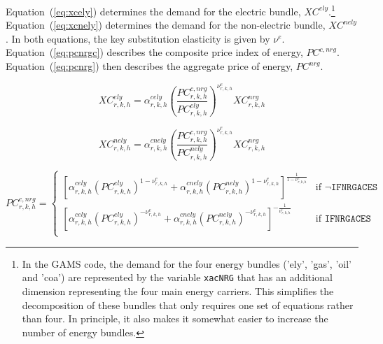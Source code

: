 \documentclass[11pt,letterpaper]{report}
\begin{document}
Equation~(\ref{eq:xcely}) determines the demand for the electric bundle,
$\mathit{XC}^{\mathit{ely}}$.\footnote{In the GAMS code, the demand for the four
energy bundles ('ely', 'gas', 'oil' and 'coa') are represented by the variable
\texttt{xacNRG} that has an additional dimension representing the four main
energy carriers. This simplifies the decomposition of these bundles that only
requires one set of equations rather than four. In principle, it also makes it
somewhat easier to increase the number of energy bundles.}
Equation~(\ref{eq:xcnely}) determines the demand for the non-electric bundle,
$\mathit{XC}^{\mathit{nely}}$. In both equations, the key substitution
elasticity is given by $\nu^{\mathit{e}}$.
Equation~(\ref{eq:pcnrgc}) describes the composite price index of energy,
$\mathit{PC}^{c, \mathit{nrg}}$.
Equation~(\ref{eq:pcnrg}) then
describes the aggregate price of energy, $\mathit{PC}^{\mathit{nrg}}$.

\begin{equation}
\label{eq:xcely}
\mathit{XC}^{\mathit{ely}}_{r,k,h} =
   \alpha^{\mathit{cely}}_{\mathit{r,k,h}}
   \left( \frac {\mathit{PC}^{c,\mathit{nrg}}_{r,k,h}}
      {\mathit{PC}^{\mathit{ely}}_{r,k,h}}
   \right)^{\nu^{\mathit{e}}_{\mathit{r,k,h}}}
   \mathit{XC}^{\mathit{nrg}}_{r,k,h}
\end{equation}

\begin{equation}
\label{eq:xcnely}
\mathit{XC}^{\mathit{nely}}_{r,k,h} =
   \alpha^{\mathit{cnely}}_{\mathit{r,k,h}}
   \left( \frac {\mathit{PC}^{c,\mathit{nrg}}_{r,k,h}}
      {\mathit{PC}^{\mathit{nely}}_{r,k,h}}
   \right)^{\nu^{\mathit{e}}_{\mathit{r,k,h}}}
   \mathit{XC}^{\mathit{nrg}}_{r,k,h}
\end{equation}

\begin{equation}
\label{eq:pcnrgc}
\mathit{PC}^{c,\mathit{nrg}}_{r,k,h} =
\begin{cases}
   \left[
      \alpha^{\mathit{cely}}_{\mathit{r,k,h}}
      \left( \mathit{PC}^{\mathit{ely}}_{r,k,h}
      \right)^{1 - \nu^{\mathit{e}}_{\mathit{r,k,h}}}
   +  \alpha^{\mathit{cnely}}_{\mathit{r,k,h}}
      \left( \mathit{PC}^{\mathit{nely}}_{r,k,h}
      \right)^{1 - \nu^{\mathit{e}}_{\mathit{r,k,h}}}
   \right]^{\frac{1} {1 - \nu^{\mathit{e}}_{\mathit{r,k,h}}}} &
   \textrm{if } \lnot \texttt{IFNRGACES} \\
   \left[
      \alpha^{\mathit{cely}}_{\mathit{r,k,h}}
      \left( \mathit{PC}^{\mathit{ely}}_{r,k,h}
      \right)^{- \nu^{\mathit{e}}_{\mathit{r,k,h}}}
   +  \alpha^{\mathit{cnely}}_{\mathit{r,k,h}}
      \left( \mathit{PC}^{\mathit{nely}}_{r,k,h}
      \right)^{- \nu^{\mathit{e}}_{\mathit{r,k,h}}}
   \right]^{-\frac{1} {\nu^{\mathit{e}}_{\mathit{r,k,h}}}} &
   \textrm{if } \texttt{IFNRGACES} \\
\end{cases}
\end{equation}
\end{document}
